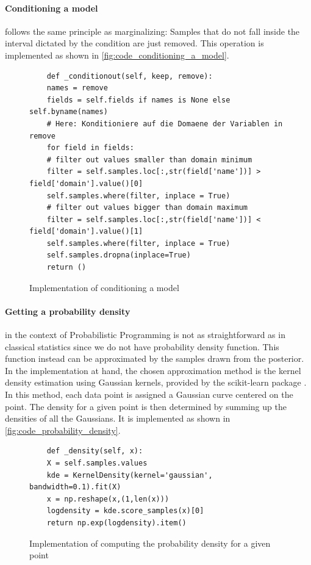 \documentclass{article}
\begin{document}
\paragraph{Conditioning a model} follows the same principle as marginalizing: Samples that do not fall inside the interval dictated by the condition are just removed. This operation is implemented as shown in \autoref{fig:code_conditioning_a_model}.
\begin{figure}[h]
	\begin{lstlisting}
	def _conditionout(self, keep, remove):
	names = remove
	fields = self.fields if names is None else self.byname(names)
	# Here: Konditioniere auf die Domaene der Variablen in remove
	for field in fields:
	# filter out values smaller than domain minimum
	filter = self.samples.loc[:,str(field['name'])] > field['domain'].value()[0]
	self.samples.where(filter, inplace = True)
	# filter out values bigger than domain maximum
	filter = self.samples.loc[:,str(field['name'])] < field['domain'].value()[1]
	self.samples.where(filter, inplace = True)
	self.samples.dropna(inplace=True)
	return ()
	\end{lstlisting}
	\caption[Implementation of conditioning a model]{Implementation of conditioning a model}
	\label{fig:code_conditioning_a_model}
\end{figure}

\paragraph{Getting a probability density} in the context of Probabilistic Programming is not as straightforward as in classical statistics since we do not have probability density function. This function instead can be approximated by the samples drawn from the posterior. In the implementation at hand, the chosen approximation method is the kernel density estimation using Gaussian kernels, provided by the scikit-learn package \cite{scikit-learn}. In this method, each data point is assigned a Gaussian curve centered on the point. The density for a given point is then determined by summing up the densities of all the Gaussians. It is implemented as shown in \autoref{fig:code_probability_density}.
\begin{figure}[h]
	\begin{lstlisting}
	def _density(self, x):
	X = self.samples.values
	kde = KernelDensity(kernel='gaussian', bandwidth=0.1).fit(X)
	x = np.reshape(x,(1,len(x)))
	logdensity = kde.score_samples(x)[0]
	return np.exp(logdensity).item()
	\end{lstlisting}
	\caption[Implementation of computing the probability density for a given point]{Implementation of computing the probability density for a given point}
	\label{fig:code_probability_density}
\end{figure}
\end{document}

